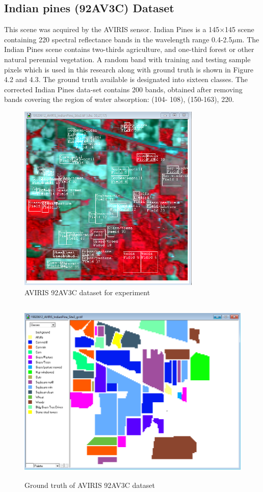 \documentclass[document.tex]{subfiles}
\begin{document}
\subsection{Indian pines (92AV3C) Dataset}
\noindent This scene was acquired by the AVIRIS sensor. Indian Pines is a 145$\times$145 scene containing
220 spectral reflectance bands in the wavelength range 0.4-2.5$\mu$m. The Indian Pines scene
contains two-thirds agriculture, and one-third forest or other natural perennial vegetation.
A random band with training and testing sample pixels which is used in this research along with ground truth is shown in Figure 4.2 and 4.3. The ground truth
available is designated into sixteen classes. The corrected Indian Pines data-set contains
200 bands, obtained after removing bands covering the region of water absorption: (104-
108), (150-163), 220.
\begin{figure}[H]
	\begin{center}
		\includegraphics[height=9.0cm]{imgs/Dataset.png}
	\end{center}
	\caption{AVIRIS 92AV3C dataset for experiment}
	\label{fig:AVIRIS 92AV3C dataset for experiment}
\end{figure}

\begin{figure}[H]
	\begin{center}
		\includegraphics[height=9.0cm]{imgs/Ground.png}
	\end{center}
	\caption{Ground truth of AVIRIS 92AV3C dataset}
	\label{fig:Ground truth of AVIRIS 92AV3C dataset}
\end{figure}
\end{document}
